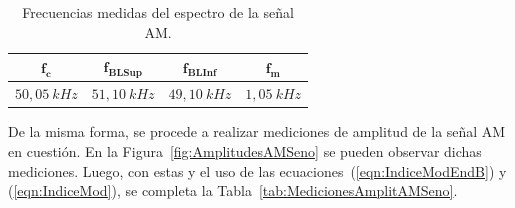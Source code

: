       \begin{table}[H]
        \centering
      \begin{tabular}{cccc} \hline \hline
          $\mathbf{f_c} $        &   $\mathbf{f_{BLSup}}$   &   $\mathbf{f_{BLInf}}$    &   $\mathbf{f_m}$  \\ \hline
          $50,05~kHz$   &   $51,10~kHz$   &    $49,10~kHz$   &   $1,05~kHz$   \\ \hline \hline
        \end{tabular}
        \caption{Frecuencias medidas del espectro de la señal AM.}
        \label{tab:MedicionesFreqAMSeno}
      \end{table}

      De la misma forma, se procede a realizar mediciones de amplitud de la señal AM en cuestión. En la
      Figura~\ref{fig:AmplitudesAMSeno} se pueden observar dichas mediciones. Luego, con estas y 
      el uso de las ecuaciones~(\ref{eqn:IndiceModEndB}) y (\ref{eqn:IndiceMod}), se completa la 
      Tabla~\ref{tab:MedicionesAmplitAMSeno}.

